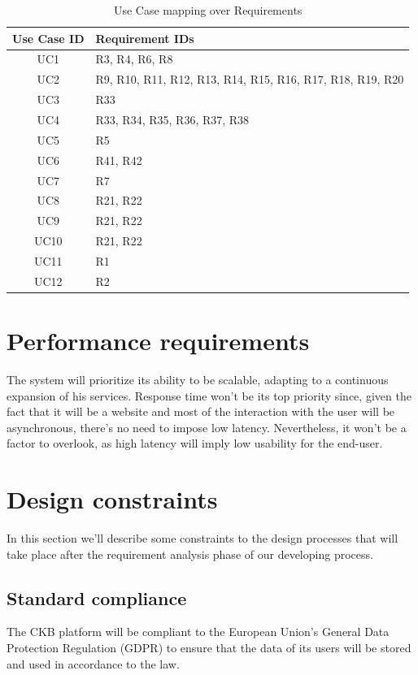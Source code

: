 \documentclass[11pt]{report}
\begin{document}
\begin{table}[h]
\centering
\begin{tabular}{|c|p{100mm}|}
\hline\rowcolor{gray!20} 
Use Case ID & Requirement IDs \\
\hline
 UC1 & R3, R4, R6, R8 \\ \hline
 UC2 & R9, R10, R11, R12, R13, R14, R15, R16, R17, R18, R19, R20 \\\hline
 UC3 & R33 \\\hline
 UC4 & R33, R34, R35, R36, R37, R38\\\hline
 UC5& R5 \\\hline
 UC6& R41, R42 \\\hline
 UC7& R7 \\\hline
 UC8& R21, R22 \\\hline
 UC9& R21, R22 \\\hline
 UC10& R21, R22 \\\hline
 UC11& R1 \\\hline
 UC12& R2 \\\hline
\end{tabular}
\caption{Use Case mapping over Requirements}
\end{table}


\newpage
\section{Performance requirements}
The system will prioritize its ability to be scalable, adapting to a continuous expansion of his services.
Response time won't be its top priority since, given the fact that it will be a website and most of the interaction with the user will be asynchronous, there's no need to impose low latency.
Nevertheless, it won't be a factor to overlook, as high latency will imply low usability for the end-user.

\section{Design constraints}
In this section we'll describe some constraints to the design processes that will take place after the 
requirement analysis phase of our developing process.

\subsection{Standard compliance} \label{standard_compliance}
The CKB platform will be compliant to the European Union's General Data Protection Regulation (GDPR) to ensure that
the data of its users will be stored and used in accordance to the law.
\end{document}
